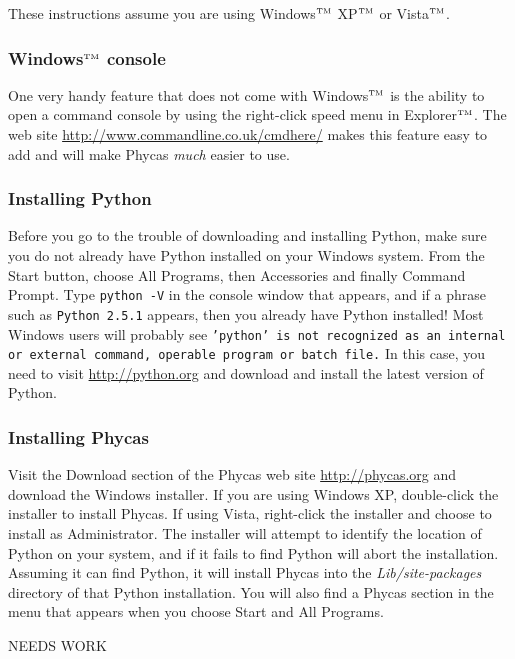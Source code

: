 \documentclass[10pt]{article}
\newcommand{\trademark}[1]{#1${}^{\mbox{\tiny TM}}$}
\newcommand{\pathname}[1]{{\em #1}}
\newcommand{\menu}[1]{{\sf #1}}
\newcommand{\code}[1]{{\tt #1}}
\begin{document}
These instructions assume you are using \trademark{Windows} \trademark{XP} or \trademark{Vista}.

\subsubsection{\trademark{Windows} console}

One very handy feature that does not come with \trademark{Windows} is the ability to open a command console by using the right-click speed menu in \trademark{Explorer}. The web site \url{http://www.commandline.co.uk/cmdhere/} makes this feature easy to add and will make Phycas {\em much} easier to use. 

\subsubsection{Installing Python}

Before you go to the trouble of downloading and installing Python, make sure you do not already have Python installed on your Windows system. From the Start button, choose \menu{All Programs}, then \menu{Accessories} and finally \menu{Command Prompt}. Type \code{python -V} in the console window that appears, and if a phrase such as \code{Python 2.5.1} appears, then you already have Python installed! Most Windows users will probably see \code{'python' is not recognized as an internal or external command, operable program or batch file.} In this case, you need to visit \url{http://python.org} and download and install the latest version of Python.

\subsubsection{Installing Phycas}

Visit the Download section of the Phycas web site \url{http://phycas.org} and download the Windows installer. If you are using Windows XP, double-click the installer to install Phycas. If using Vista, right-click the installer and choose to install as Administrator. The installer will attempt to identify the location of Python on your system, and if it fails to find Python will abort the installation. Assuming it can find Python, it will install Phycas into the \pathname{Lib/site-packages} directory of that Python installation. You will also find a Phycas section in the menu that appears when you choose \menu{Start} and \menu{All Programs}.

NEEDS WORK
\end{document}

